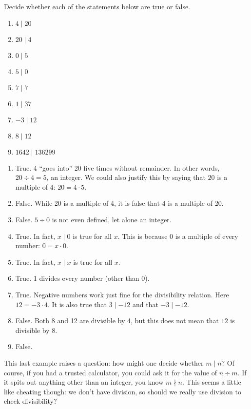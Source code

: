 \documentclass[12pt]{article}
\begin{document}
\begin{example}
	Decide whether each of the statements below are true or false.
	\begin{multicols}{3}
		\begin{enumerate}
			\item $4 \mid 20$
			\item $20 \mid 4$
			\item $0 \mid 5$
			\item $5 \mid 0$
			\item $7 \mid 7$
			\item $1 \mid 37$		
			\item $-3 \mid 12$
			\item $8 \mid 12$
			\item $1642 \mid 136299$
		\end{enumerate}
	\end{multicols}
	
	\begin{solution}
		\begin{enumerate}
			\item True.  4 ``goes into'' 20 five times without remainder.  In other words, $20 \div 4 = 5$, an integer. We could also justify this by saying that $20$ is a multiple of 4: $20 = 4\cdot 5$.
			\item False. While 20 is a multiple of 4, it is false that $4$ is a multiple of 20.  
			\item False.  $5 \div 0$ is not even defined, let alone an integer.  
			\item True.  In fact, $x \mid 0$ is true for all $x$.  This is because 0 is a multiple of every number: $0 = x\cdot 0$.
			\item True.  In fact, $x \mid x$ is true for all $x$.
			\item True.  1 divides every number (other than 0).
			\item True.  Negative numbers work just fine for the divisibility relation.  Here $12 = -3 \cdot 4$.	It is also true that $3 \mid -12$ and that $-3 \mid -12$.
			\item False.  Both 8 and 12 are divisible by 4, but this does not mean that $12$ is divisible by $8$.
			\item False.  
		\end{enumerate}
	\end{solution}
\end{example}

This last example raises a question: how might one decide whether $m \mid n$?  Of course, if you had a trusted calculator, you could ask it for the value of $n \div m$.  If it spits out anything other than an integer, you know $m \nmid n$.  This seems a little like cheating though: we don't have division, so should we really use division to check divisibility?
\end{document}
